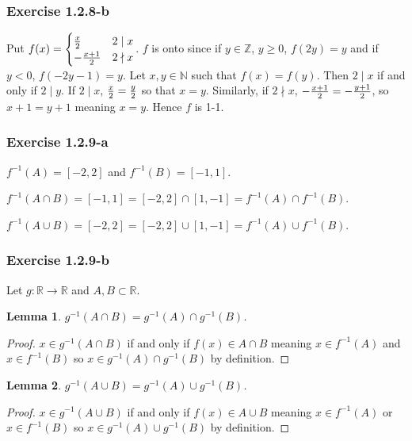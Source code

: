 \documentclass{article}
\newcommand{\R}{\mathbb{R}}
\newcommand{\Z}{\mathbb{Z}}
\newcommand{\N}{\mathbb{N}}
\newtheorem*{lemma}{Lemma}
\begin{document}
\subsubsection*{Exercise 1.2.8-b}

Put $f(x) = \begin{cases} {x \over 2} & 2 \mid x \\ - {x + 1 \over 2} & 2 \nmid x\end{cases}$. $f$ is onto since if $y \in \Z$, $y \geq 0$, $f(2y) = y$ and if $y < 0$, $f(-2y - 1) = y$.
Let $x, y \in \N$ such that $f(x) = f(y)$. Then $2 \mid x$ if and only if $2 \mid y$. If $2 \mid x$, ${x \over 2} = {y \over 2}$ so that $x = y$.
Similarly, if $2 \nmid x$, $- {x + 1 \over 2} = - {y + 1 \over 2}$, so $x + 1 = y + 1$ meaning $x = y$. Hence $f$ is 1-1.

\subsubsection*{Exercise 1.2.9-a}

$f^{-1}(A) = [-2, 2]$ and $f^{-1}(B) = [-1, 1]$.

$f^{-1}(A \cap B) = [-1, 1] = [-2, 2] \cap [1, -1] = f^{-1}(A) \cap f^{-1}(B)$.

$f^{-1}(A \cup B) = [-2, 2] = [-2, 2] \cup [1, -1] = f^{-1}(A) \cup f^{-1}(B)$.

\subsubsection*{Exercise 1.2.9-b}

Let $g: \R \to \R$ and $A, B \subset \R$.

\begin{lemma}
$g^{-1}(A \cap B) = g^{-1}(A) \cap g^{-1}(B)$.
\end{lemma}

\begin{proof}
$x \in g^{-1}(A \cap B)$ if and only if $f(x) \in A \cap B$ meaning $x \in f^{-1}(A)$ and $x \in f^{-1}(B)$ so $x \in g^{-1}(A) \cap g^{-1}(B)$ by definition.
\end{proof}

\begin{lemma}
$g^{-1}(A \cup B) = g^{-1}(A) \cup g^{-1}(B)$.
\end{lemma}

\begin{proof}
$x \in g^{-1}(A \cup B)$ if and only if $f(x) \in A \cup B$ meaning $x \in f^{-1}(A)$ or $x \in f^{-1}(B)$ so $x \in g^{-1}(A) \cup g^{-1}(B)$ by definition.
\end{proof}
\end{document}
